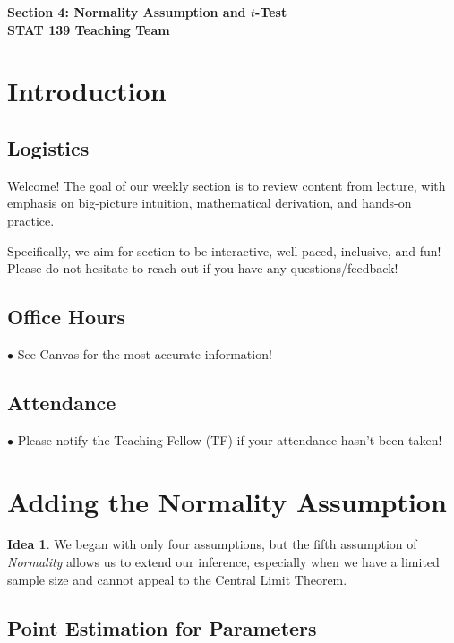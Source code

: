 \documentclass[12pt,oneside]{article}
\theoremstyle{definition}
\newtheorem*{idea}{Idea}
\theoremstyle{remark}
\begin{document}
\pagestyle{fancy}
\begin{center}
\bf \Large
Section 4: Normality Assumption and $t$-Test \\[0.5em]
\normalsize
STAT 139 Teaching Team
\end{center}

\section{Introduction}

\subsection{Logistics}

Welcome! The goal of our weekly section is to review content from lecture, with emphasis on big-picture intuition, mathematical derivation, and hands-on practice.

Specifically, we aim for section to be interactive, well-paced, inclusive, and fun! Please do not hesitate to reach out if you have any questions/feedback!

\subsection{Office Hours}

$\bullet$ See Canvas for the most accurate information!

\subsection{Attendance}

$\bullet$ Please notify the Teaching Fellow (TF) if your attendance hasn't been taken!

\section{Adding the Normality Assumption}

\begin{idea}
We began with only four assumptions, but the fifth assumption of \textit{Normality} allows us to extend our inference, especially when we have a limited sample size and cannot appeal to the Central Limit Theorem.
\end{idea}

\subsection{Point Estimation for Parameters}
\end{document}
